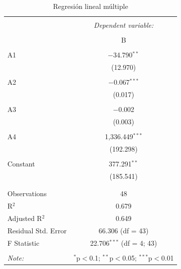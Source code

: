 \documentclass[a4paper,10pt]{article}\usepackage[]{graphicx}\usepackage[]{color}
\begin{document}
\begin{table}[!htbp] \centering 
  \caption{Regresión lineal múltiple} 
  \label{} 
\begin{tabular}{@{\extracolsep{5pt}}lc} 
\\[-1.8ex]\hline 
\hline \\[-1.8ex] 
 & \multicolumn{1}{c}{\textit{Dependent variable:}} \\ 
\cline{2-2} 
\\[-1.8ex] & B \\ 
\hline \\[-1.8ex] 
 A1 & $-$34.790$^{**}$ \\ 
  & (12.970) \\ 
  & \\ 
 A2 & $-$0.067$^{***}$ \\ 
  & (0.017) \\ 
  & \\ 
 A3 & $-$0.002 \\ 
  & (0.003) \\ 
  & \\ 
 A4 & 1,336.449$^{***}$ \\ 
  & (192.298) \\ 
  & \\ 
 Constant & 377.291$^{**}$ \\ 
  & (185.541) \\ 
  & \\ 
\hline \\[-1.8ex] 
Observations & 48 \\ 
R$^{2}$ & 0.679 \\ 
Adjusted R$^{2}$ & 0.649 \\ 
Residual Std. Error & 66.306 (df = 43) \\ 
F Statistic & 22.706$^{***}$ (df = 4; 43) \\ 
\hline 
\hline \\[-1.8ex] 
\textit{Note:}  & \multicolumn{1}{r}{$^{*}$p$<$0.1; $^{**}$p$<$0.05; $^{***}$p$<$0.01} \\ 
\end{tabular} 
\end{table} 
\end{document}
